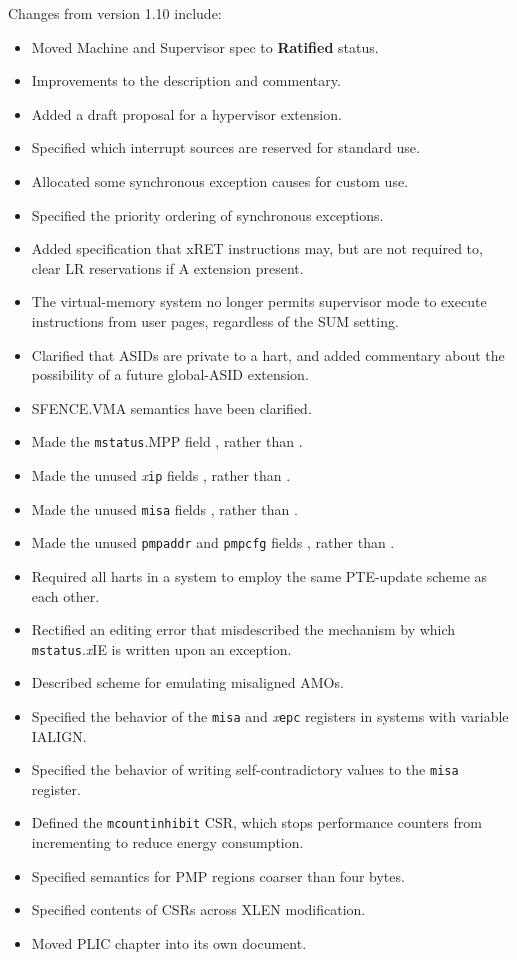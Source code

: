 Changes from version 1.10 include:
\vspace{-0.2in}
\begin{itemize}
  \parskip 0pt
  \itemsep 1pt
  \item Moved Machine and Supervisor spec to {\bf Ratified} status.
\item Improvements to the description and commentary.
\item Added a draft proposal for a hypervisor extension.
\item Specified which interrupt sources are reserved for standard use.
\item Allocated some synchronous exception causes for custom use.
\item Specified the priority ordering of synchronous exceptions.
\item Added specification that xRET instructions may, but are not
  required to, clear LR reservations if A extension present.
\item The virtual-memory system no longer permits supervisor mode to execute
  instructions from user pages, regardless of the SUM setting.
\item Clarified that ASIDs are private to a hart, and added commentary about
  the possibility of a future global-ASID extension.
\item SFENCE.VMA semantics have been clarified.
\item Made the {\tt mstatus}.MPP field \warl, rather than \wlrl.
\item Made the unused {\em x}{\tt ip} fields \wpri, rather than \wiri.
\item Made the unused {\tt misa} fields \warl, rather than \wiri.
\item Made the unused {\tt pmpaddr} and {\tt pmpcfg} fields \warl, rather than \wiri.
\item Required all harts in a system to employ the same PTE-update scheme as each other.
\item Rectified an editing error that misdescribed the mechanism by which
  {\tt mstatus}.{\em x}IE is written upon an exception.
\item Described scheme for emulating misaligned AMOs.
\item Specified the behavior of the {\tt misa} and {\em x}{\tt epc} registers in
  systems with variable IALIGN.
\item Specified the behavior of writing self-contradictory values to the
  {\tt misa} register.
\item Defined the {\tt mcountinhibit} CSR, which stops performance
  counters from incrementing to reduce energy consumption.
\item Specified semantics for PMP regions coarser than four bytes.
\item Specified contents of CSRs across XLEN modification.
\item Moved PLIC chapter into its own document.
\end{itemize}

